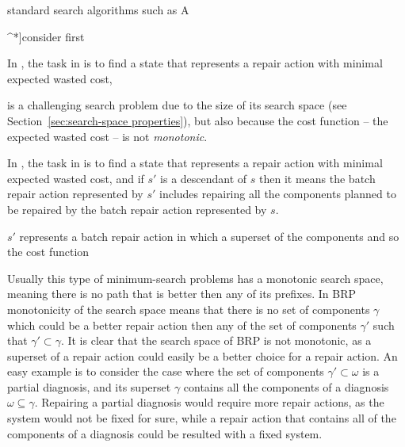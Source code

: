 standard search algorithms such as A{^*]consider first 


In \brps{}, the task in \brps{} is to find a state that represents a repair action with minimal expected wasted cost, 


\brpswc{} is a challenging search problem due to the size of its search space (see Section~\ref{sec:search-space properties}), 
but also because the cost function -- the expected wasted cost -- is not \emph{monotonic}. 







In \brps{}, the task in \brps{} is to find a state that represents a repair action with minimal expected wasted cost, 
and if $s'$ is a descendant of $s$ then it means 
the batch repair action represented by $s'$ 
includes repairing all the components planned to be repaired by the batch repair action represented by $s$. 

$s'$ represents a batch repair action in which a superset of 
the components 
and so the cost function 


Usually this type of minimum-search problems has a monotonic search space, meaning there is no path that is better then any of its prefixes. In BRP monotonicity of the search space means that there is no set of components $\gamma$ which could be a better repair action then any of the set of components $\gamma'$ such that ${\gamma}' \subset \gamma$. It is clear that the search space of BRP is not monotonic, as a superset of a repair action could easily be a better choice for a repair action. An easy example is to consider the case where the set of components $\gamma' \subset \omega$ is a partial diagnosis, and its superset $\gamma$ contains all the components of a diagnosis $\omega \subseteq \gamma$. Repairing a partial diagnosis would require more repair actions, as the system would not be fixed for sure, while a repair action that contains all of the components of a diagnosis could be resulted with a fixed system.

}
